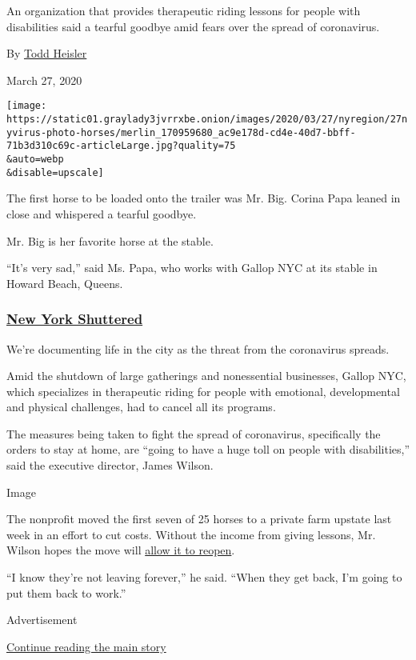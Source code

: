 An organization that provides therapeutic riding lessons for people with
disabilities said a tearful goodbye amid fears over the spread of
coronavirus.

By \href{https://www.nytimes3xbfgragh.onion/by/todd-heisler}{Todd
Heisler}

March 27, 2020

\texttt{[image: https://static01.graylady3jvrrxbe.onion/images/2020/03/27/nyregion/27nyvirus-photo-horses/merlin\_170959680\_ac9e178d-cd4e-40d7-bbff-71b3d310c69c-articleLarge.jpg?quality=75\\\&auto=webp\\\&disable=upscale]}

The first horse to be loaded onto the trailer was Mr. Big. Corina Papa
leaned in close and whispered a tearful goodbye.

Mr. Big is her favorite horse at the stable.

``It's very sad,'' said Ms. Papa, who works with Gallop NYC at its
stable in Howard Beach, Queens.

\hypertarget{new-york-shuttered}{%
\subsubsection{\texorpdfstring{\href{https://www.nytimes3xbfgragh.onion/spotlight/new-york-shuttered}{New
York Shuttered}}{New York Shuttered}}\label{new-york-shuttered}}

We're documenting life in the city as the threat from the coronavirus
spreads.

Amid the shutdown of large gatherings and nonessential businesses,
Gallop NYC, which specializes in therapeutic riding for people with
emotional, developmental and physical challenges, had to cancel all its
programs.

The measures being taken to fight the spread of coronavirus,
specifically the orders to stay at home, are ``going to have a huge toll
on people with disabilities,'' said the executive director, James
Wilson.

Image

The nonprofit moved the first seven of 25 horses to a private farm
upstate last week in an effort to cut costs. Without the income from
giving lessons, Mr. Wilson hopes the move will
\href{https://gallop.nyc/feedtheherd}{allow it to reopen}.

``I know they're not leaving forever,'' he said. ``When they get back,
I'm going to put them back to work.''

Advertisement

\protect\hyperlink{after-bottom}{Continue reading the main story}

